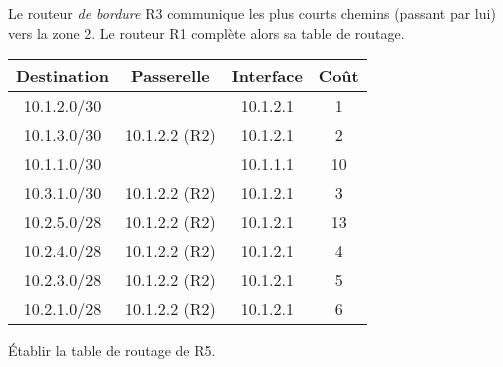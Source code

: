 \documentclass[a4paper,11pt]{article}
\begin{document}
Le routeur \emph{de bordure} R3 communique les plus courts chemins (passant par lui) vers la zone 2. Le routeur R1 complète alors sa table de routage.
\begin{center}
    \begin{tabular}{|*{4}{c|}}
        \hline
        Destination & Passerelle & Interface & Coût \\
        \hline
        10.1.2.0/30 &  & 10.1.2.1 & 1 \\
        \hline
        10.1.3.0/30 & 10.1.2.2 (R2) & 10.1.2.1 & 2 \\
        \hline
        10.1.1.0/30 &  & 10.1.1.1 & 10 \\
        \hline
        10.3.1.0/30 & 10.1.2.2 (R2) & 10.1.2.1 & 3 \\
        \hline
        10.2.5.0/28 & 10.1.2.2 (R2) & 10.1.2.1 & 13 \\
        \hline
        10.2.4.0/28 & 10.1.2.2 (R2) & 10.1.2.1 & 4 \\
        \hline
        10.2.3.0/28 & 10.1.2.2 (R2) & 10.1.2.1 & 5 \\
        \hline
        10.2.1.0/28 & 10.1.2.2 (R2) & 10.1.2.1 & 6 \\
        \hline
    \end{tabular}
\end{center}
\begin{activite}
Établir la table de routage de R5.
\end{activite}
\end{document}
